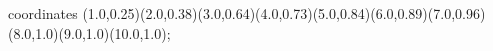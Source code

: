 					coordinates { (1.0,0.25)(2.0,0.38)(3.0,0.64)(4.0,0.73)(5.0,0.84)(6.0,0.89)(7.0,0.96)(8.0,1.0)(9.0,1.0)(10.0,1.0)};